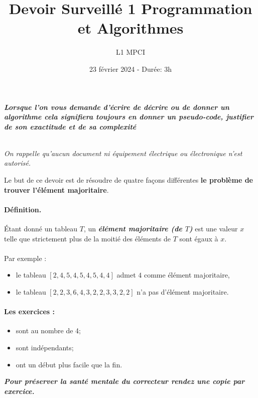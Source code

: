 \documentclass{article}
\title{Devoir Surveillé 1 Programmation et Algorithmes}
\author{L1 MPCI}
\date{23 février 2024 - Durée: 3h}
\theoremstyle{exostyle}
\theoremstyle{partiestyle}
\theoremstyle{questionstyle}
\begin{document}
\maketitle

\begin{center}
{\em\bf Lorsque l'on vous demande d'écrire de décrire ou de donner un algorithme cela signifiera toujours en donner un pseudo-code, justifier de son exactitude et de sa complexité}

~\\

{\em On rappelle qu'aucun document ni équipement électrique ou électronique n'est autorisé. }
\end{center}

\vspace*{1cm}
Le but de ce devoir est de résoudre de quatre façons différentes {\bf le problème de trouver l'élément majoritaire}.

\paragraph*{Définition.}\'Etant donné un tableau $T$, un {\it\bf élément majoritaire (de $T$)} est une valeur $x$ telle que strictement plus de la moitié des éléments de $T$ sont égaux à $x$.

\paragraph*{}Par exemple :
\begin{itemize}
    \item le tableau $[2,4,5,4,5,4, 5, 4, 4]$ admet $4$ comme élément majoritaire,
    \item le tableau $[2,2,3,6,4,3,2,2,3,3,2,2]$ n'a pas d'élément majoritaire. 
\end{itemize}
    

\paragraph*{Les exercices :}
\begin{itemize}
\item sont au nombre de 4;
\item sont indépendants;
\item ont un début plus facile que la fin.
\end{itemize}

\vspace*{2cm}
\begin{center}
    {\em\bf\sc\Large Pour préserver la santé mentale du correcteur rendez une copie par exercice.}
    
\end{center}
\end{document}
